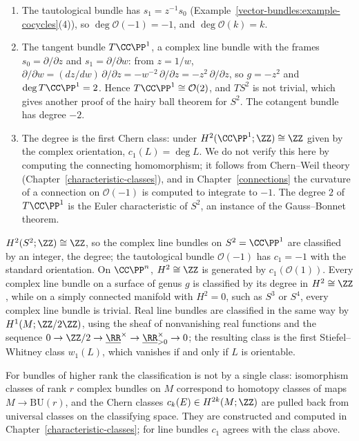 \begin{example}\label{vector-bundles:example-degrees}
\begin{enumerate}
\item The tautological bundle has $s_1 = z^{-1}s_0$ (Example~\ref{vector-bundles:example-cocycles}(4)), so $\deg\mathcal{O}(-1) = -1$, and $\deg\mathcal{O}(k) = k$.
\item The tangent bundle $T\CC\PP^1$, a complex line bundle with the frames $s_0 = \partial/\partial z$ and $s_1 = \partial/\partial w$: from $z = 1/w$,
$\partial/\partial w = (dz/dw)\,\partial/\partial z = -w^{-2}\,\partial/\partial z = -z^2\,\partial/\partial z$, so $g = -z^2$ and $\deg T\CC\PP^1 = 2$. Hence
$T\CC\PP^1 \cong \mathcal{O}(2)$, and $TS^2$ is not trivial, which gives another proof of the hairy ball theorem for $S^2$. The cotangent bundle has degree $-2$.
\item The degree is the first Chern class: under $H^2(\CC\PP^1; \ZZ) \cong \ZZ$ given by the complex orientation, $c_1(L) = \deg L$. We do not verify this here by computing the
connecting homomorphism; it follows from Chern--Weil theory (Chapter~\ref{characteristic-classes}), and in Chapter~\ref{connections} the curvature of a connection on
$\mathcal{O}(-1)$ is computed to integrate to $-1$. The degree $2$ of $T\CC\PP^1$ is the Euler characteristic of $S^2$, an instance of the Gauss--Bonnet theorem.
\end{enumerate}
\end{example}

\begin{example}\label{vector-bundles:example-line-bundles}
$H^2(S^2; \ZZ) \cong \ZZ$, so the complex line bundles on $S^2 = \CC\PP^1$ are classified by an integer, the degree; the tautological bundle $\mathcal{O}(-1)$ has $c_1 = -1$ with the standard
orientation. On $\CC\PP^n$, $H^2 \cong \ZZ$ is generated by $c_1(\mathcal{O}(1))$. Every complex line bundle on a surface of genus $g$ is classified by its degree in $H^2 \cong \ZZ$, while on a simply
connected manifold with $H^2 = 0$, such as $S^3$ or $S^4$, every complex line bundle is trivial. Real line bundles are classified in the same way by
$H^1(M; \ZZ/2\ZZ)$, using the sheaf of nonvanishing real functions and the sequence $0 \to \ZZ/2 \to \underline{\RR}^\times \to \underline{\RR}^\times_{>0} \to 0$; the resulting class is the first
Stiefel--Whitney class $w_1(L)$, which vanishes if and only if $L$ is orientable.
\end{example}

\begin{remark}\label{vector-bundles:remark-higher-chern}
For bundles of higher rank the classification is not by a single class: isomorphism classes of rank $r$ complex bundles on $M$ correspond to homotopy classes of maps $M \to \mathrm{BU}(r)$, and the Chern
classes $c_k(E) \in H^{2k}(M; \ZZ)$ are pulled back from universal classes on the classifying space. They are constructed and computed in Chapter~\ref{characteristic-classes}; for line bundles $c_1$ agrees
with the class above.
\end{remark}

